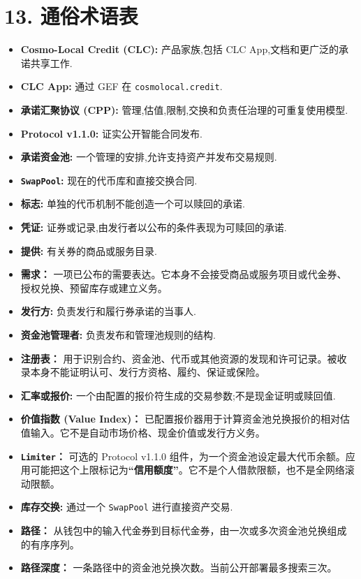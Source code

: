 \documentclass[11pt]{article}
\begin{document}
\section*{13. 通俗术语表}

\begin{itemize}[leftmargin=*]
\item \textbf{Cosmo-Local Credit (CLC):} 产品家族,包括 CLC App,文档和更广泛的承诺共享工作.
\item \textbf{CLC App:} 通过 GEF 在 \texttt{cosmolocal.credit}.
\item \textbf{承诺汇聚协议 (CPP):} 管理,估值,限制,交换和负责任治理的可重复使用模型.
\item \textbf{Protocol v1.1.0:} 证实公开智能合同发布.
\item \textbf{承诺资金池:} 一个管理的安排,允许支持资产并发布交易规则.
\item \textbf{\texttt{SwapPool}:} 现在的代币库和直接交换合同.
\item \textbf{标志:} 单独的代币机制不能创造一个可以赎回的承诺.
\item \textbf{凭证:} 证券或记录,由发行者以公布的条件表现为可赎回的承诺.
\item \textbf{提供:} 有关券的商品或服务目录.
\item \textbf{需求：} 一项已公布的需要表达。它本身不会接受商品或服务项目或代金券、授权兑换、预留库存或建立义务。
\item \textbf{发行方:} 负责发行和履行券承诺的当事人.
\item \textbf{资金池管理者:} 负责发布和管理池规则的结构.
\item \textbf{注册表：} 用于识别合约、资金池、代币或其他资源的发现和许可记录。被收录本身不能证明认可、发行方资格、履约、保证或保险。
\item \textbf{汇率或报价:} 一个由配置的报价符生成的交易参数;不是现金证明或赎回值.
\item \textbf{价值指数 (Value Index)：} 已配置报价器用于计算资金池兑换报价的相对估值输入。它不是自动市场价格、现金价值或发行方义务。
\item \textbf{\texttt{Limiter}：} 可选的 Protocol v1.1.0 组件，为一个资金池设定最大代币余额。应用可能把这个上限标记为\textbf{``信用额度''}。它不是个人借款限额，也不是全网络滚动限额。
\item \textbf{库存交换:} 通过一个 \texttt{SwapPool} 进行直接资产交易.
\item \textbf{路径：} 从钱包中的输入代金券到目标代金券，由一次或多次资金池兑换组成的有序序列。
\item \textbf{路径深度：} 一条路径中的资金池兑换次数。当前公开部署最多搜索三次。

\end{itemize}
\end{document}
